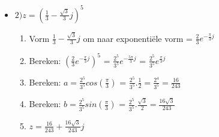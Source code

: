\documentclass[12pt]{report}
\begin{document}
\begin{itemize}
\begin{itemize}
\begin{enumerate}
     \end{enumerate}

   \end{itemize}

   \item $2)z = (\frac{1}{3} - \frac{\sqrt{3}}{3}j)^5$
   \begin{enumerate}
    \item Vorm $\frac{1}{3} - \frac{\sqrt{3}}{3}j$ om naar exponentiële vorm = $\frac{2}{3}e^{-\frac{\pi}{3}j}$
    \item Bereken: $(\frac{2}{3}e^{-\frac{\pi}{3}j})^5$ = $\frac{2^5}{3^5}e^{-\frac{5\pi}{3}j}$ = $\frac{2^5}{3^5}e^{\frac{\pi}{3}j}$
    \item Bereken: $a = \frac{2^5}{3^5}cos(\frac{\pi}{3})$ = $\frac{2^5}{3^5} . \frac{1}{2} = \frac{2^4}{3^5} = \frac{16}{243}$
    \item Bereken: $b = \frac{2^5}{3^5}sin(\frac{\pi}{3})$ = $\frac{2^5}{3^5} . \frac{\sqrt{3}}{2} = \frac{16\sqrt{3}}{243}$
    \item $z = \frac{16}{243} + \frac{16\sqrt{3}}{243}j$
  \end{enumerate}


  \end{itemize}

  
\end{document}
